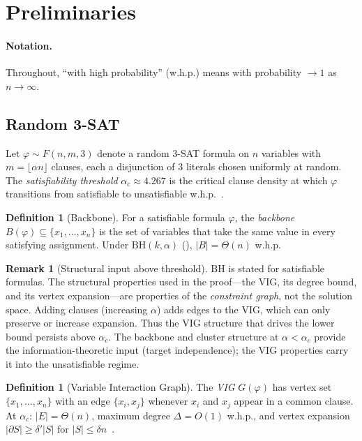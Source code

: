 \documentclass[11pt]{article}
\theoremstyle{definition}
\newtheorem{definition}[theorem]{Definition}
\newtheorem{remark}[theorem]{Remark}
\begin{document}
\section{Preliminaries}\label{sec:prelim}

\paragraph{Notation.}
Throughout, ``with high probability'' (w.h.p.) means with probability
$\to 1$ as $n \to \infty$.

\subsection{Random 3-SAT}

Let $\varphi \sim F(n, m, 3)$ denote a random 3-SAT formula on $n$
variables with $m = \lfloor \alpha n \rfloor$ clauses, each a disjunction
of 3 literals chosen uniformly at random.  The \emph{satisfiability
threshold} $\alpha_c \approx 4.267$ is the critical clause density at
which $\varphi$ transitions from satisfiable to unsatisfiable
w.h.p.~\cite{DingSly2015}.

\begin{definition}[Backbone]\label{def:backbone}
For a satisfiable formula $\varphi$, the \emph{backbone}
$B(\varphi) \subseteq \{x_1, \ldots, x_n\}$ is the set of variables
that take the same value in every satisfying assignment.  Under
$\mathrm{BH}(k, \alpha)$ (), $|B| = \Theta(n)$ w.h.p.
\end{definition}

\begin{remark}[Structural input above threshold]\label{rem:above-threshold}
$\mathrm{BH}$ is stated for satisfiable formulas.  The structural
properties used in the proof---the VIG, its degree bound, and its
vertex expansion---are properties of the \emph{constraint graph}, not
the solution space.  Adding clauses (increasing $\alpha$) adds edges
to the VIG, which can only preserve or increase expansion.  Thus
the VIG structure that drives the lower bound persists above $\alpha_c$.
The backbone and cluster structure at $\alpha < \alpha_c$ provide
the information-theoretic input (target independence); the VIG
properties carry it into the unsatisfiable regime.
\end{remark}

\begin{definition}[Variable Interaction Graph]\label{def:VIG}
The \emph{VIG} $G(\varphi)$ has vertex set $\{x_1, \ldots, x_n\}$ with
an edge $\{x_i, x_j\}$ whenever $x_i$ and $x_j$ appear in a common
clause.  At $\alpha_c$: $|E| = \Theta(n)$, maximum degree
$\Delta = O(1)$ w.h.p., and vertex expansion $|\partial S| \geq
\delta'|S|$ for $|S| \leq \delta n$~\cite{Chvatal1988}.
\end{definition}
\end{document}
